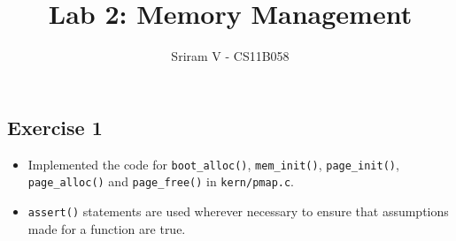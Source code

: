 \documentclass[]{article}
\title{Lab 2: Memory Management}
\author{Sriram V - CS11B058}
\date{}
\begin{document}
\maketitle

\subsection{Exercise 1}

\begin{itemize}
\itemsep1pt\parskip0pt
\item
  Implemented the code for \texttt{boot\_alloc()}, \texttt{mem\_init()},
  \texttt{page\_init()}, \texttt{page\_alloc()} and
  \texttt{page\_free()} in \texttt{kern/pmap.c}.
\item
  \texttt{assert()} statements are used wherever necessary to ensure
  that assumptions made for a function are true.
\end{itemize}
\end{document}
